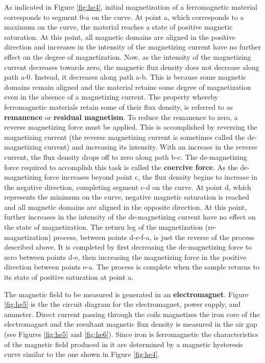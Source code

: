 As indicated in Figure \ref{fig:he4}, initial magnetization of a ferromagnetic material corresponds to segment 0-a on the curve. At point a, which corresponds to a maximum on the curve, the material reaches a state of positive magnetic saturation. At this point, all magnetic domains are aligned in the positive direction and increases in the intensity of the magnetizing current have no further effect on the degree of magnetization. Now, as the intensity of the magnetizing current decreases towards zero, the magnetic flux density does not decrease along path a-0. Instead, it decreases along path a-b. This is because some magnetic domains remain aligned and the material retains some degree of magnetization even in the absence of a magnetizing current. The property whereby ferromagnetic materials retain some of their flux density, is referred to as {\bf remanence} or {\bf residual magnetism}. To reduce the remanence to zero, a reverse magnetizing force must be applied. This is accomplished by reversing the magnetizing current (the reverse magnetizing current is sometimes called the de-magnetizing current) and increasing its intensity. With an increase in the reverse current, the flux density drops off to zero along path b-c. The de-magnetizing force required to accomplish this task is called the {\bf coercive force}. As the de-magnetizing force increases beyond point c, the flux density begins to increase in the negative direction, completing segment c-d on the curve. At point d, which represents the minimum on the curve, negative magnetic saturation is reached and all magnetic domains are aligned in the opposite direction. At this point, further increases in the intensity of the de-magnetizing current have no effect on the state of magnetization. The return leg of the magnetization (re-magnetization) process, between points d-e-f-a, is just the reverse of the process described above. It is completed by first decreasing the de-magnetizing force to zero between points d-e, then increasing the magnetizing force in the positive direction between points e-a. The process is complete when the sample returns to its state of positive saturation at point a.

The magnetic field to be measured is generated in an {\bf electromagnet}. Figure \ref{fig:he5} is the the circuit diagram for the electromagnet, power supply, and ammeter. Direct current passing through the coils magnetizes the iron core of the electromagnet and the resultant magnetic flux density is measured in the air gap (see Figures \ref{fig:he5} and \ref{fig:he6}). Since iron is ferromagnetic the characteristics of the magnetic field produced in it are determined by a magnetic hysteresis curve similar to the one shown in Figure \ref{fig:he4}.


